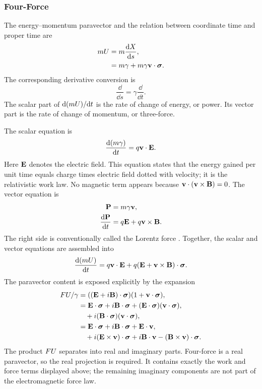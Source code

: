 \subsubsection{Four-Force}
The energy--momentum paravector and the relation between coordinate time and
proper time are
\begin{align*}
m U &= m\frac{\mathrm d X}{\mathrm d s},\notag \\
&= m \gamma + m \gamma \mathbf{v} \cdot \mathbf{\bm{\sigma}}.
\end{align*}
The corresponding derivative conversion is
\begin{equation*}
\frac{\dd}{\dd s}=\gamma\frac{\dd}{\dd t}.
\end{equation*}
The scalar part of \(\mathrm d(mU)/\mathrm d t\) is the rate of change of energy,
or power. Its vector part is the rate of change of momentum, or
three-force.

The scalar equation is
\begin{equation*}
\frac{\mathrm d(m\gamma)}{\mathrm d t}=q\mathbf{v}\cdot\mathbf{E}.
\end{equation*}
Here \(\mathbf{E}\) denotes the electric field. This equation states that the
energy gained per unit time equals charge times electric field dotted with
velocity; it is the relativistic work law. No magnetic term appears because
\(\mathbf{v}\cdot(\mathbf{v}\times\mathbf{B})=0\). The vector equation is
\begin{align*}
\mathbf{P} &= m \gamma \mathbf{v}, \\
\frac{\mathrm d\mathbf{P}}{\mathrm d t} &= q \mathbf{E} + q \mathbf{v} \times \mathbf{B}.
\end{align*}
The right side is conventionally called the Lorentz force
\cite{lorentz1904,jackson1998}. Together, the scalar and vector equations
are assembled into
\begin{equation*}
\frac{\mathrm d(mU)}{\mathrm d t}
=q\mathbf{v}\cdot\mathbf{E}
+q(\mathbf{E}+\mathbf{v}\times\mathbf{B})\cdot\mathbf{\bm{\sigma}}.
\end{equation*}
The paravector content is exposed explicitly by the expansion
\begin{align*}
FU / \gamma &= ((\mathbf{E} + i \mathbf{B}) \cdot \mathbf{\bm{\sigma}} ) ( 1 + \mathbf{v} \cdot \mathbf{\bm{\sigma}} ),\notag \\
&= \mathbf{E} \cdot \mathbf{\bm{\sigma}} + i \mathbf{B} \cdot \mathbf{\bm{\sigma}} + (\mathbf{E} \cdot \mathbf{\bm{\sigma}} ) (\mathbf{v} \cdot \mathbf{\bm{\sigma}} ),\notag \\
&\quad + i (\mathbf{B} \cdot \mathbf{\bm{\sigma}} )(\mathbf{v} \cdot \mathbf{\bm{\sigma}} ),\notag \\
&= \mathbf{E} \cdot \mathbf{\bm{\sigma}} + i \mathbf{B} \cdot \mathbf{\bm{\sigma}} + \mathbf{E} \cdot \mathbf{v},\notag \\
&\quad + i (\mathbf{E} \times \mathbf{v}) \cdot \mathbf{\bm{\sigma}} + i \mathbf{B} \cdot \mathbf{v} - (\mathbf{B} \times \mathbf{v}) \cdot \mathbf{\bm{\sigma}}.
\end{align*}
The product \(FU\) separates into real and imaginary parts.
Four-force is a real paravector, so the real projection is required. It
contains exactly the work and force terms displayed above; the remaining
imaginary components are not part of the electromagnetic force law.


